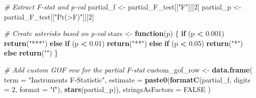 \documentclass[
]{article}
\newenvironment{Shaded}{\begin{snugshade}}{\end{snugshade}}
\newcommand{\AttributeTok}[1]{\textcolor[rgb]{0.13,0.29,0.53}{#1}}
\newcommand{\CommentTok}[1]{\textcolor[rgb]{0.56,0.35,0.01}{\textit{#1}}}
\newcommand{\ConstantTok}[1]{\textcolor[rgb]{0.56,0.35,0.01}{#1}}
\newcommand{\ControlFlowTok}[1]{\textcolor[rgb]{0.13,0.29,0.53}{\textbf{#1}}}
\newcommand{\DecValTok}[1]{\textcolor[rgb]{0.00,0.00,0.81}{#1}}
\newcommand{\FloatTok}[1]{\textcolor[rgb]{0.00,0.00,0.81}{#1}}
\newcommand{\FunctionTok}[1]{\textcolor[rgb]{0.13,0.29,0.53}{\textbf{#1}}}
\newcommand{\NormalTok}[1]{#1}
\newcommand{\OtherTok}[1]{\textcolor[rgb]{0.56,0.35,0.01}{#1}}
\newcommand{\SpecialCharTok}[1]{\textcolor[rgb]{0.81,0.36,0.00}{\textbf{#1}}}
\newcommand{\StringTok}[1]{\textcolor[rgb]{0.31,0.60,0.02}{#1}}
\begin{document}
\begin{Shaded}
\begin{Highlighting}[]
\CommentTok{\# Extract F{-}stat and p{-}val}
\NormalTok{partial\_f }\OtherTok{\textless{}{-}}\NormalTok{ partial\_F\_test[[}\StringTok{"F"}\NormalTok{]][}\DecValTok{2}\NormalTok{]}
\NormalTok{partial\_p }\OtherTok{\textless{}{-}}\NormalTok{ partial\_F\_test[[}\StringTok{"Pr(\textgreater{}F)"}\NormalTok{]][}\DecValTok{2}\NormalTok{]}

\CommentTok{\# Create asterisks based on p{-}val}
\NormalTok{stars }\OtherTok{\textless{}{-}} \ControlFlowTok{function}\NormalTok{(p) \{}
  \ControlFlowTok{if}\NormalTok{ (p }\SpecialCharTok{\textless{}} \FloatTok{0.001}\NormalTok{) }\FunctionTok{return}\NormalTok{(}\StringTok{"***"}\NormalTok{)}
  \ControlFlowTok{else} \ControlFlowTok{if}\NormalTok{ (p }\SpecialCharTok{\textless{}} \FloatTok{0.01}\NormalTok{) }\FunctionTok{return}\NormalTok{(}\StringTok{"**"}\NormalTok{)}
  \ControlFlowTok{else} \ControlFlowTok{if}\NormalTok{ (p }\SpecialCharTok{\textless{}} \FloatTok{0.05}\NormalTok{) }\FunctionTok{return}\NormalTok{(}\StringTok{"*"}\NormalTok{)}
  \ControlFlowTok{else} \FunctionTok{return}\NormalTok{(}\StringTok{""}\NormalTok{)}
\NormalTok{\}}

\CommentTok{\# Add custom GOF row for the partial F{-}stat}
\NormalTok{custom\_gof\_row }\OtherTok{\textless{}{-}} \FunctionTok{data.frame}\NormalTok{(}
  \AttributeTok{term =} \StringTok{"Instrument\textquotesingle{}s F{-}Statistic"}\NormalTok{,}
  \AttributeTok{estimate =} \FunctionTok{paste0}\NormalTok{(}\FunctionTok{formatC}\NormalTok{(partial\_f, }\AttributeTok{digits =} \DecValTok{2}\NormalTok{, }\AttributeTok{format =} \StringTok{"f"}\NormalTok{), }\FunctionTok{stars}\NormalTok{(partial\_p)),}
  \AttributeTok{stringsAsFactors =} \ConstantTok{FALSE}
\NormalTok{)}



\end{Highlighting}
\end{Shaded}
\end{document}
